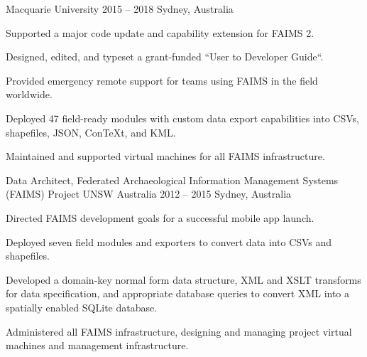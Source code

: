 \begin{cventries}
    {Macquarie University} %
    {2015 -- 2018} %
    {Sydney, Australia} %
    {\begin{cvitems}%
    \item {Supported a major code update and capability extension for FAIMS 2.}
    \item {Designed, edited, and typeset a grant-funded ``User to Developer Guide``.}
    \item {Provided emergency remote support for teams using FAIMS in the field worldwide.}
    \item {Deployed 47 field-ready modules with custom data export capabilities into CSVs, shapefiles, JSON, Con\TeX{}t, and KML.}
    \item {Maintained and supported virtual machines for all FAIMS infrastructure.}
\end{cvitems}}
 
\cventry
    {Data Architect, Federated Archaeological Information Management Systems (FAIMS) Project} %
    {UNSW Australia} %
    {2012 -- 2015} %
    {Sydney, Australia} %
    {\begin{cvitems}%
    \item {Directed FAIMS development goals for a successful mobile app launch.}
    \item {Deployed seven field modules and exporters to convert data into CSVs and shapefiles.}
    \item {Developed a domain-key normal form data structure, XML and XSLT transforms for data specification, and appropriate database queries to convert XML into a spatially enabled SQLite database.}
    \item {Administered all FAIMS infrastructure, designing and managing project virtual machines and management infrastructure.}
    \end{cvitems}}   




\end{cventries}
